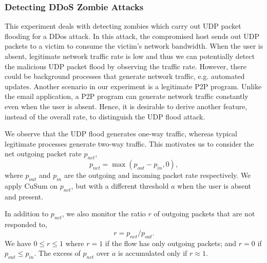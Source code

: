 \subsubsection{Detecting DDoS Zombie Attacks} \label{subsec:ddos-method}

This experiment deals with detecting zombies which carry out UDP
packet flooding for a DDos attack. In this attack, the compromised
host sends out UDP packets to a victim to consume the victim's
network bandwidth. When the user is absent, legitimate network
traffic rate is low and thus we can potentially detect the malicious
UDP packet flood by observing the traffic rate. However, there could
be background processes that generate network traffic, e.g.
automated updates. Another scenario in our experiment is a
legitimate P2P program.
Unlike the email application, a P2P program can generate network
traffic constantly even when the user is absent. Hence, it is desirable to
derive another feature, instead of the overall rate, to distinguish the
UDP flood attack.

We observe that the UDP flood generates one-way traffic, whereas typical
legitimate processes generate two-way traffic. This motivates us to
consider the net outgoing packet rate $p_{net}$,
\[p_{net} = \max(p_{out} - p_{in},0),\]
\noindent where $p_{out}$ and $p_{in}$ are the outgoing and incoming
packet rate respectively.   We apply CuSum on $p_{net}$, but with a
different threshold $a$ when the user is absent and present.

In addition to $p_{net}$, we also monitor the ratio $r$ of outgoing
packets that are not responded to, \[r=p_{net}/p_{out}.\] We have $0
\leq r \leq 1$ where $r=1$ if the flow has only outgoing packets;
and $r=0$ if $p_{out} \leq p_{in}$. The excess of $p_{net}$ over $a$
is accumulated only if $r \approx 1$.

